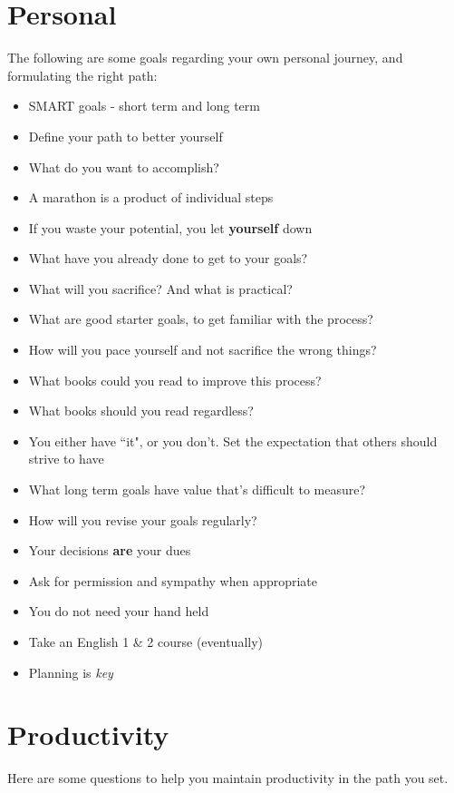 \section{Personal}

The following are some goals regarding your own personal journey, and formulating the right path:

\begin{itemize}
\item{SMART goals - short term and long term}
\item{Define your path to better yourself}
\item{What do you want to accomplish?}
\item{A marathon is a product of individual steps}
\item{If you waste your potential, you let \textbf{yourself} down}
\item{What have you already done to get to your goals?}
\item{What will you sacrifice? And what is practical?}
\item{What are good starter goals, to get familiar with the process?}
\item{How will you pace yourself and not sacrifice the wrong things?}
\item{What books could you read to improve this process?}
\item{What books should you read regardless?}
\item{You either have ``it", or you don't. Set the expectation that others should strive to have}
\item{What long term goals have value that's difficult to measure?}
\item{How will you revise your goals regularly?}
\item{Your decisions \textbf{are} your dues}
\item{Ask for permission and sympathy when appropriate}
\item{You do not need your hand held}
\item{Take an English 1 \& 2 course (eventually)}
\item{Planning is \textit{key}}
\end{itemize}

\section{Productivity}

Here are some questions to help you maintain productivity in the path you set.

